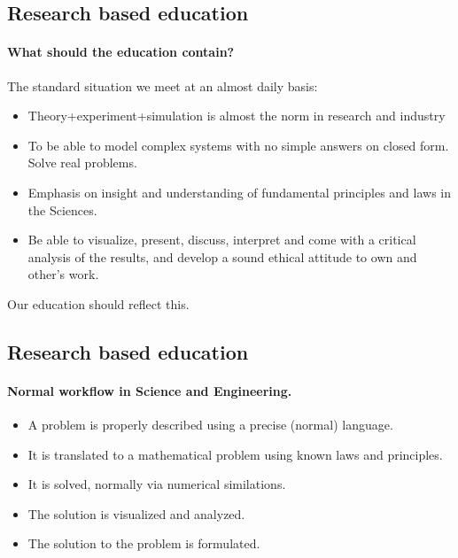 \documentclass[%
twoside,                 %
final,                   %
10pt]{article}
\begin{document}
\noindent





\subsection*{Research based education}

\paragraph{What should the education contain?}
The standard situation we meet at an almost daily basis:

\begin{itemize}
\item Theory+experiment+simulation is almost the norm in research and industry

\item To be able to model complex systems with no simple answers on closed form. Solve real problems.

\item Emphasis on insight and understanding of fundamental principles and laws in the Sciences.

\item Be able to visualize, present, discuss, interpret and come with a critical analysis of the results, and develop a sound ethical attitude to own and other's work.
\end{itemize}

\noindent
Our education should reflect this.





\subsection*{Research based education}

\paragraph{Normal workflow in Science and Engineering.}

\begin{itemize}
\item A problem is properly described using a precise (normal) language.

\item It is translated to a mathematical problem using known laws and  principles.

\item It is solved, normally via numerical similations.

\item The solution is visualized and analyzed.

\item The solution to the problem is formulated.
\end{itemize}
\end{document}
